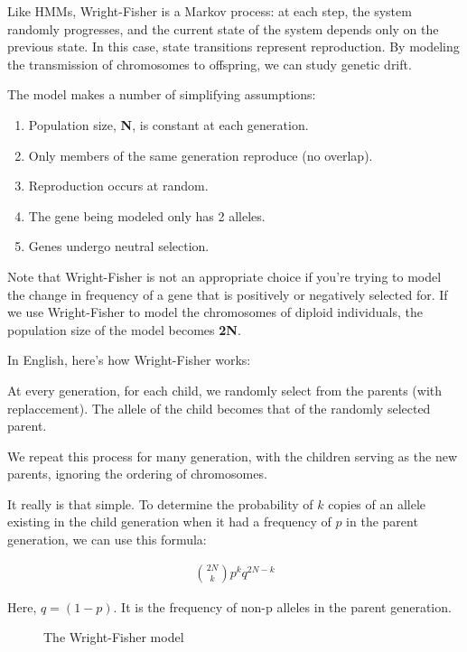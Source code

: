 Like HMMs, Wright-Fisher is a Markov process: at each step, the system
randomly progresses, and the current state of the system depends only 
on the previous state. In this case, state transitions represent reproduction.
By modeling the transmission of chromosomes to offspring, we can study genetic drift.

The model makes a number of simplifying assumptions:
\begin{enumerate}
\item Population size, \textbf{N}, is constant at each generation.
\item Only members of the same generation reproduce (no overlap).
\item Reproduction occurs at random.
\item The gene being modeled only has 2 alleles.
\item Genes undergo neutral selection.
\end{enumerate}

Note that Wright-Fisher is not an appropriate choice if you're trying to
model the change in frequency of a gene that is positively or negatively
selected for. If we use Wright-Fisher to model the chromosomes of diploid
individuals, the population size of the model becomes \textbf{2N}.


In English, here's how Wright-Fisher works:

At every generation, for each child, we randomly select from the parents (with replaccement). The allele of the child becomes that of the randomly selected parent.

We repeat this process for many generation, with the children serving as the new parents, ignoring the ordering of chromosomes.


It really is that simple. To determine the probability of $k$ copies of an allele
existing in the child generation when it had a frequency of $p$ in the parent
generation, we can use this formula:

\begin{align}
\binom{2N}{k} p^{k} q^{2N-k}
\end{align}

Here, $q = (1-p)$. It is the frequency of non-p alleles in the parent generation.

\begin{figure} [ht!] 
  \centering 
  \caption{The Wright-Fisher model}
  \label{Fig13_FisherWrightModel}
\end{figure}

